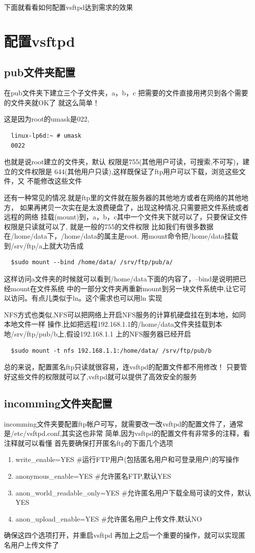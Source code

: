 \documentclass[adobefonts]{ctexart}
\begin{document}
下面就看看如何配置vsftpd达到需求的效果


\section{配置vsftpd}
\subsection{pub文件夹配置}
在pub文件夹下建立三个子文件夹，a，b，c
把需要的文件直接用拷贝到各个需要的文件夹就OK了
就这么简单！

这是因为root的umask是022,
\begin{verbatim}
  linux-lp6d:~ # umask 
  0022
\end{verbatim}
也就是说root建立的文件夹，默认
权限是755(其他用户可读，可搜索,不可写)，建立的文件权限是
644(其他用户只读),这样既保证了ftp用户可以下载，浏览这些文件，又
不能修改这些文件

还有一种常见的情况.就是ftp里的文件就在服务器的其他地方或者在网络的其他地方，
如果再拷贝一次实在是太浪费硬盘了，出现这种情况,只需要把文件系统或者远程的网络
挂载(mount)到，a，b，c其中一个文件夹下就可以了，只要保证文件权限是只读就可以了,
就是一般的755的文件权限
比如我们有很多数据在/home/data下，/home/data的属主是root.
用mount命令把/home/data挂载到/srv/ftp/a上就大功告成
\begin{verbatim}
  $sudo mount --bind /home/data/ /srv/ftp/pub/a/
\end{verbatim}
这样访问a文件夹的时候就可以看到/home/data下面的内容了，--bind是说明把已经mount在文件系统
中的一部分文件夹再重新mount到另一块文件系统中,让它可以访问。有点儿类似于ln。这个需求也可以用ln
实现

NFS方式也类似,NFS可以把网络上开启NFS服务的计算机硬盘挂在到本地，如同本地文件一样
操作,比如把远程192.168.1.1的/home/data文件夹挂载到本地/srv/ftp/pub/b上,假设192.168.1.1
上的NFS服务器已经开启
\begin{verbatim}
  $sudo mount -t nfs 192.168.1.1:/home/data/ /srv/ftp/pub/b
\end{verbatim}

总的来说，配置匿名ftp只读就很容易，连vsftpd的配置文件都不用修改！
只要管好这些文件的权限就可以了,vsftpd就可以提供了高效安全的服务
\subsection{incomming文件夹配置}
incomming文件夹要配置ftp帐户可写，就需要改一改vsftpd的配置文件了，通常是/etc/vsftpd.conf,其实这也非常
简单,因为vsftpd的配置文件有非常多的注释，看注释就可以看懂
首先要确保打开匿名ftp的下面几个选项
\begin{enumerate}
\item write\_enable=YES     \#运行FTP用户(包括匿名用户和可登录用户)的写操作
\item anonymous\_enable=YES \#允许匿名FTP,默认YES
\item anon\_world\_readable\_only=YES \#允许匿名用户下载全局可读的文件，默认YES
\item anon\_upload\_enable=YES \#允许匿名用户上传文件,默认NO
\end{enumerate}
确保这四个选项打开，并重启vsftpd
再加上之后一个重要的操作，就可以实现匿名用户上传文件了
\end{document}
